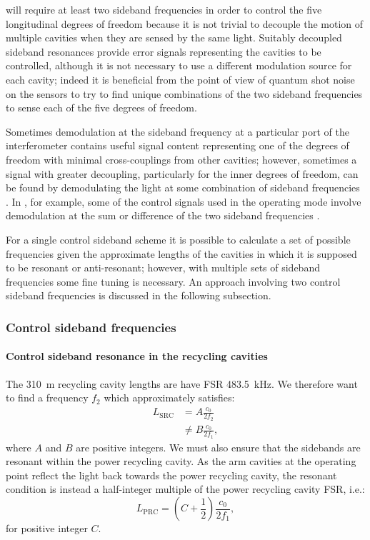 \ETLF{} will require at least two sideband frequencies in order to control the five longitudinal degrees of freedom because it is not trivial to decouple the motion of multiple cavities when they are sensed by the same light. Suitably decoupled sideband resonances provide error signals representing the cavities to be controlled, although it is not necessary to use a different modulation source for each cavity; indeed it is beneficial from the point of view of quantum shot noise on the sensors to try to find unique combinations of the two sideband frequencies to sense each of the five degrees of freedom.

Sometimes demodulation at the sideband frequency at a particular port of the interferometer contains useful signal content representing one of the degrees of freedom with minimal cross-couplings from other cavities; however, sometimes a signal with greater decoupling, particularly for the inner degrees of freedom, can be found by demodulating the light at some combination of sideband frequencies \cite{Strain2003, Barr2006}. In \ALIGO{}, for example, some of the control signals used in the operating mode involve demodulation at the sum or difference of the two sideband frequencies \cite{Abbott2010}.

For a single control sideband scheme it is possible to calculate a set of possible frequencies given the approximate lengths of the cavities in which it is supposed to be resonant or anti-resonant; however, with multiple sets of sideband frequencies some fine tuning is necessary. An approach involving two control sideband frequencies is discussed in the following subsection.

\subsubsection{Control sideband frequencies}

\paragraph{Control sideband resonance in the recycling cavities}
The \SI{310}{\meter} recycling cavity lengths are have \gls{FSR} \SI{483.5}{\kilo\hertz}. We therefore want to find a frequency $f_2$ which approximately satisfies:
\begin{equation}
  \label{eq:src-fsr}
  \begin{split}
    L_{\text{SRC}} &= A \frac{c_0}{2 f_2} \\
                   &\neq B \frac{c_0}{2 f_1},
  \end{split}
\end{equation}
where $A$ and $B$ are positive integers. We must also ensure that the sidebands are resonant within the power recycling cavity. As the arm cavities at the operating point reflect the light back towards the power recycling cavity, the resonant condition is instead a half-integer multiple of the power recycling cavity \gls{FSR}, i.e.:
\begin{equation}
  \label{eq:prc-fsr}
  L_{\text{PRC}} = \left(C + \frac{1}{2} \right) \frac{c_0}{2 f_1},
\end{equation}
for positive integer $C$.

